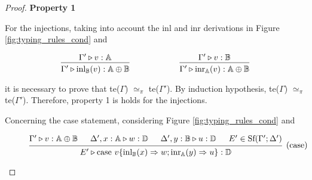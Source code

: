\documentclass[10pt,a4paper]{amsart}
\theoremstyle{definition}
\theoremstyle{definition}
\theoremstyle{definition}
\theoremstyle{definition}
\theoremstyle{definition}
\theoremstyle{definition}
\begin{document}
  \begin{proof}

    \textbf{Property 1}

    For the injections, taking into account the inl and inr derivations in Figure \ref{fig:typing_rules_cond} and

  \begin{figure} [H]
    \begin{equation*}
    \begin{aligned}
      &
      \begin{prooftree}
      \hypo{\Gamma' \triangleright v: \mathbb{A}}
      \infer1[]{\Gamma' \triangleright \text{inl}_{\mathbb{B}}(v): \mathbb{A} \oplus \mathbb{B}}
      \end{prooftree}
      \hspace{60pt}
      \begin{prooftree}
      \hypo{\Gamma' \triangleright v: \mathbb{B}}
      \infer1[]{\Gamma' \triangleright \text{inr}_{\mathbb{A}}(v): \mathbb{A} \oplus \mathbb{B}},
      \end{prooftree} \\
    \end{aligned}
    \end{equation*}
    \end{figure}
it is necessary to prove that te($\Gamma$) $\simeq_{\pi}$  te($\Gamma'$). By induction hypothesis, te($\Gamma$) $\simeq_{\pi}$  te($\Gamma'$). Therefore, property 1 is holds for the injections.


Concerning the case statement, considering  Figure \ref{fig:typing_rules_cond} and 
  
\begin{figure} [H]
    \begin{equation*}
    \begin{aligned}
      \begin{prooftree}
          \hypo{\Gamma' \triangleright v: \mathbb{A} \oplus \mathbb{B}}
          \hypo{\Delta', x: \mathbb{A} \triangleright w: \mathbb{D}}
          \hypo{\Delta', y: \mathbb{B} \triangleright u: \mathbb{D}}
          \hypo{E' \in \text{Sf}(\Gamma'; \Delta')}
          \infer4[(case)]{E' \triangleright \text{case } v \{\text{inl}_{\mathbb{B}}(x) \Rightarrow w ; \text{inr}_{\mathbb{A}}(y) \Rightarrow u\}: \mathbb{D}}
          \end{prooftree}
    \end{aligned}
    \end{equation*}
    \end{figure}


\end{proof}
\end{document}
